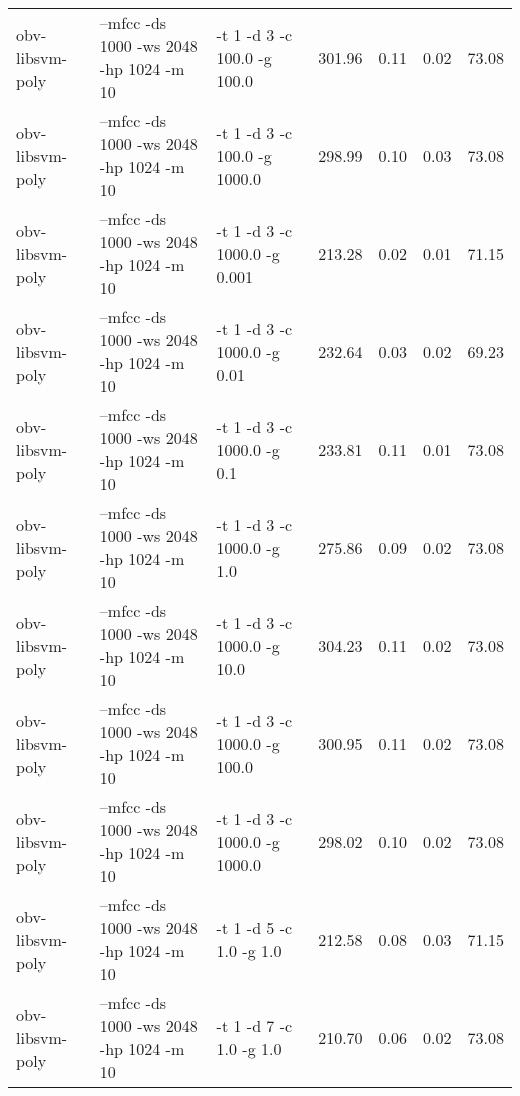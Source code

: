 \documentclass[11pt,a4paper]{article}
\begin{document}
\begin{tabular}{lllrrrr}
 obv-libsvm-poly  &  --mfcc -ds 1000 -ws 2048 -hp 1024 -m 10  &  -t 1 -d 3  -c 100.0  -g 100.0   &  301.96  &  0.11  &  0.02  &  73.08  \\
 obv-libsvm-poly  &  --mfcc -ds 1000 -ws 2048 -hp 1024 -m 10  &  -t 1 -d 3  -c 100.0  -g 1000.0  &  298.99  &  0.10  &  0.03  &  73.08  \\
 obv-libsvm-poly  &  --mfcc -ds 1000 -ws 2048 -hp 1024 -m 10  &  -t 1 -d 3  -c 1000.0 -g 0.001   &  213.28  &  0.02  &  0.01  &  71.15  \\
 obv-libsvm-poly  &  --mfcc -ds 1000 -ws 2048 -hp 1024 -m 10  &  -t 1 -d 3  -c 1000.0 -g 0.01    &  232.64  &  0.03  &  0.02  &  69.23  \\
 obv-libsvm-poly  &  --mfcc -ds 1000 -ws 2048 -hp 1024 -m 10  &  -t 1 -d 3  -c 1000.0 -g 0.1     &  233.81  &  0.11  &  0.01  &  73.08  \\
 obv-libsvm-poly  &  --mfcc -ds 1000 -ws 2048 -hp 1024 -m 10  &  -t 1 -d 3  -c 1000.0 -g 1.0     &  275.86  &  0.09  &  0.02  &  73.08  \\
 obv-libsvm-poly  &  --mfcc -ds 1000 -ws 2048 -hp 1024 -m 10  &  -t 1 -d 3  -c 1000.0 -g 10.0    &  304.23  &  0.11  &  0.02  &  73.08  \\
 obv-libsvm-poly  &  --mfcc -ds 1000 -ws 2048 -hp 1024 -m 10  &  -t 1 -d 3  -c 1000.0 -g 100.0   &  300.95  &  0.11  &  0.02  &  73.08  \\
 obv-libsvm-poly  &  --mfcc -ds 1000 -ws 2048 -hp 1024 -m 10  &  -t 1 -d 3  -c 1000.0 -g 1000.0  &  298.02  &  0.10  &  0.02  &  73.08  \\
 obv-libsvm-poly  &  --mfcc -ds 1000 -ws 2048 -hp 1024 -m 10  &  -t 1 -d 5  -c 1.0    -g 1.0     &  212.58  &  0.08  &  0.03  &  71.15  \\
 obv-libsvm-poly  &  --mfcc -ds 1000 -ws 2048 -hp 1024 -m 10  &  -t 1 -d 7  -c 1.0    -g 1.0     &  210.70  &  0.06  &  0.02  &  73.08  \\
\end{tabular}
\end{document}
